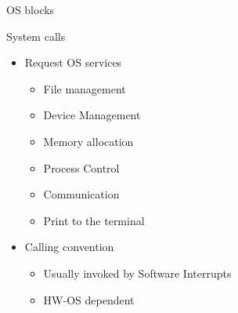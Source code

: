 \documentclass{beamer}
\begin{document}
\begin{frame}{OS blocks}
\begin{center}
\end{center}
\end{frame}






\begin{frame}{System calls}
    \begin{itemize}
      \item Request OS services
    \begin{itemize}
      \item \alert<2>{File management}
      \item Device Management
      \item Memory allocation
      \item Process Control
      \item Communication
      \item Print to the terminal
   \end{itemize}
   \item Calling convention
    \begin{itemize}
    \item Usually invoked by Software Interrupts
    \item HW-OS dependent
   \end{itemize}
   \end{itemize}
\end{frame}
\end{document}
